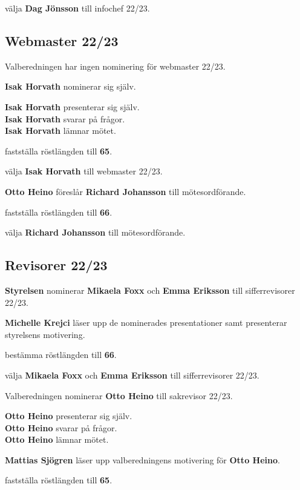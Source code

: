 \documentclass[../protokoll_varmote_2022.tex]{subfiles}
\begin{document}
\motetbeslutar
\att{} välja \textbf{Dag Jönsson} till infochef 22/23.



\subsection{Webmaster 22/23}
Valberedningen har ingen nominering för webmaster 22/23.

\textbf{Isak Horvath} nominerar sig själv.

\textbf{Isak Horvath} presenterar sig själv.\\
\textbf{Isak Horvath} svarar på frågor.\\
\textbf{Isak Horvath} lämnar mötet.


\motetbeslutar\att{} fastställa röstlängden till \textbf{65}.

\motetbeslutar
\att{} välja \textbf{Isak Horvath} till webmaster 22/23.


\textbf{Otto Heino} föreslår \textbf{Richard Johansson} till mötesordförande.

\motetbeslutar\att{} fastställa röstlängden till \textbf{66}.

\motetbeslutar\att{} välja \textbf{Richard Johansson} till mötesordförande. 

\subsection{Revisorer 22/23}
\textbf{Styrelsen} nominerar \textbf{Mikaela Foxx} och \textbf{Emma Eriksson} till sifferrevisorer 22/23.

\textbf{Michelle Krejci} läser upp de nominerades presentationer samt presenterar styrelsens motivering.

\motetbeslutar\att{} bestämma röstlängden till \textbf{66}.

\motetbeslutar\att{} välja \textbf{Mikaela Foxx} och \textbf{Emma Eriksson} till sifferrevisorer 22/23.

Valberedningen nominerar \textbf{Otto Heino} till sakrevisor 22/23.

\textbf{Otto Heino} presenterar sig själv.\\
\textbf{Otto Heino} svarar på frågor.\\
\textbf{Otto Heino} lämnar mötet.

\textbf{Mattias Sjögren} läser upp valberedningens motivering för \textbf{Otto Heino}.

\motetbeslutar\att{} fastställa röstlängden till \textbf{65}.
\end{document}
